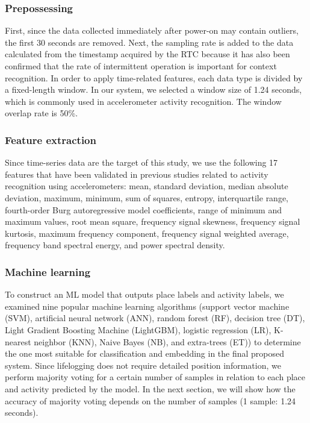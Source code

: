 \documentclass[conference]{IEEEtran}
\newcommand{\add}[1]{\textcolor{black}{#1}}	%
\begin{document}
\subsubsection{Prepossessing}
First, since the data collected immediately after power-on may contain outliers, the first 30 seconds are removed.
Next, the sampling rate is added to the data calculated from the timestamp acquired by the RTC because it has also been confirmed that the rate of intermittent operation is important for context recognition\cite{lan2017capsense,lan2020capacitor}.
In order to apply time-related features, each data type is divided \add{by} a fixed-length window.
In our system, we selected a window size of 1.24 seconds\cite{torigoe2020strike, nakamura2019waistonbelt}, which is commonly used in accelerometer activity recognition.
The window overlap rate is 50\%.

\subsubsection{Feature extraction}
Since time-series data are the target of this study, we use the following 17 features that have been validated in previous studies\cite{torigoe2020strike,nakamura2019waistonbelt} related to activity recognition using accelerometers: mean, standard deviation, median absolute deviation, maximum, minimum, sum of squares, entropy, interquartile range, fourth-order Burg autoregressive model coefficients, range of minimum and maximum values, root mean square, frequency signal skewness, frequency signal kurtosis, maximum frequency component, frequency signal weighted average, frequency band spectral energy, and power spectral density.

\subsubsection{Machine learning}
To construct an ML model that outputs place labels and activity labels, we examined nine popular machine learning algorithms (support vector machine (SVM), artificial neural network (ANN), random forest (RF), decision tree (DT), Light Gradient Boosting Machine (LightGBM), logistic regression (LR), K-nearest neighbor (KNN), Naive Bayes (NB), and extra-trees (ET)) to determine the one most suitable for classification and embedding in the final proposed system.
Since lifelogging does not require detailed position information, we perform majority voting for a certain number of samples in relation to each place and activity predicted by the model.
In the next section, we will show how the accuracy of majority voting depends on the number of samples (1 sample: 1.24 seconds).
\end{document}
